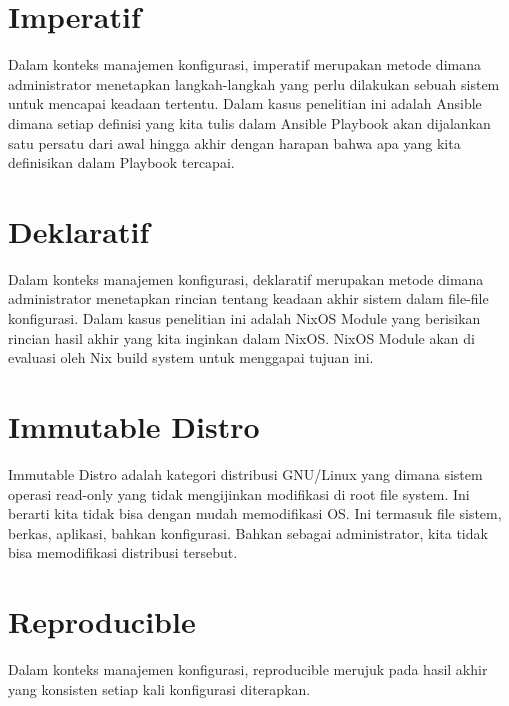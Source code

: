 \documentclass[10pt,]{report}
\begin{document}
\section{Imperatif}
\begin{adjustwidth}{7mm}{}
	\vspace{-3mm}
	Dalam konteks manajemen konfigurasi, imperatif merupakan metode dimana
	administrator menetapkan langkah-langkah yang perlu dilakukan sebuah sistem
	untuk mencapai keadaan tertentu. Dalam kasus penelitian ini adalah Ansible
	dimana setiap definisi yang kita tulis dalam Ansible Playbook akan dijalankan\\
	satu persatu dari awal hingga akhir dengan harapan bahwa apa yang kita
	definisikan dalam Playbook tercapai.
\end{adjustwidth}
\section{Deklaratif}
\begin{adjustwidth}{7mm}{}
	\vspace{-3mm}
	Dalam konteks manajemen konfigurasi, deklaratif merupakan metode dimana
	administrator menetapkan rincian tentang keadaan akhir sistem dalam file-file
	konfigurasi. Dalam kasus penelitian ini adalah NixOS Module yang berisikan
	rincian hasil akhir yang kita inginkan dalam NixOS. NixOS Module akan di
	evaluasi oleh Nix build system untuk menggapai tujuan ini.
\end{adjustwidth}
\section{Immutable Distro}
\begin{adjustwidth}{7mm}{}
	\vspace{-3mm}
	Immutable Distro adalah kategori distribusi GNU/Linux yang dimana sistem
	operasi read-only yang tidak mengijinkan modifikasi di root file system. Ini
	berarti kita tidak bisa dengan mudah memodifikasi OS. Ini termasuk file
	sistem, berkas, aplikasi, bahkan konfigurasi. Bahkan sebagai administrator,
	kita tidak bisa memodifikasi distribusi tersebut.
\end{adjustwidth}
\section{Reproducible}
\begin{adjustwidth}{7mm}{}
	\vspace{-3mm}
	Dalam konteks manajemen konfigurasi, reproducible merujuk pada hasil akhir
	yang konsisten setiap kali konfigurasi diterapkan.
\end{adjustwidth}
\end{document}
